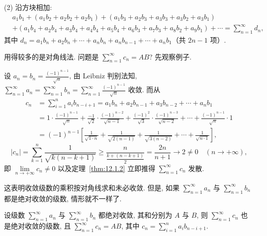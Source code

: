 (2) 沿方块相加:
\[
  \begin{aligned}
    &a_{1}b_{1}+(a_{1}b_{2}+a_{2}b_{2}+a_{2}b_{1})+(a_{1}b_{3}+a_{2}b_{3}+a_{3}b_{3}+a_{3}b_{2}+a_{3}b_{1})\\
    &+\left(a_{1}b_{4}+a_{2}b_{4}+a_{3}b_{4}+a_{4}b_{4}+a_{5}b_{4}+a_{6}b_{3}+a_{7}b_{3}+a_{8}b_{2}+a_{9}b_{1}\right)+\cdots=\sum_{n=1}^{\infty}d_{n},
  \end{aligned}
\]
其中 $d_{n}=a_{1}b_{n}+a_{2}b_{n}+\cdots+a_{n}b_{n}+a_{n}b_{n-1}+\cdots+a_{n}b_{1}$（共 $2n-1$ 项）.

用得较多的是对角线法. 问题是 $\sum_{n=1}^{\infty}c_{n}=AB$? 先观察例子.

\begin{example}\label{ex:12.4.1}
设 $a_{n}=b_{n}=\frac{(-1)^{n-1}}{\sqrt{n}}$, 由 Leibniz 判别法知, $\sum_{n=1}^{\infty}a_{n}=\sum_{n=1}^{\infty}b_{n}=\sum_{n=1}^{\infty}\frac{(-1)^{n-1}}{\sqrt{n}}$ 收敛. 而从
\[
  \begin{aligned}
    c_{n}&=\sum_{i=1}^{n}a_{i}b_{n-i+1}=a_{1}b_{n}+a_{2}b_{n-1}+a_{3}b_{n-2}+\cdots+a_{n}b_{1}\\
    &=1\cdot\frac{(-1)^{n-1}}{\sqrt{n}}+\frac{-1}{\sqrt{2}}\cdot\frac{(-1)^{n-2}}{\sqrt{n-1}}+\frac{(-1)^{2}}{\sqrt{3}}\cdot\frac{(-1)^{n-3}}{\sqrt{n-2}}+\cdots+\frac{(-1)^{n-1}}{\sqrt{n}}\cdot1\\
    &=(-1)^{n-1}\left[\frac{1}{\sqrt{1\cdot n}}+\frac{1}{\sqrt{2(n-1)}}+\frac{1}{\sqrt{3(n-2)}}+\cdots+\frac{1}{\sqrt{n\cdot1}}\right],
  \end{aligned}
\]
\[
  |c_{n}|=\sum_{k=1}^{n}\frac{1}{\sqrt{k(n-k+1)}}\geqslant\frac{n}{\frac{k+(n-k+1)}{2}}=\frac{2n}{n+1}\to2\neq0\quad(n\to+\infty),
\]
即 $\lim\limits_{n\to+\infty}c_{n}\neq0$ 以及定理~\ref{thm:12.1.2} 立即推得 $\sum_{n=1}^{\infty}c_{n}$ 发散.
\end{example}

这表明收敛级数的乘积按对角线求和未必收敛. 但是, 如果 $\sum_{n=1}^{\infty}a_{n}$ 与 $\sum_{n=1}^{\infty}b_{n}$ 都是绝对收敛的级数, 情形就不一样了.

\begin{theorem}[Cauchy]\label{thm:12.4.1}
设级数 $\sum_{n=1}^{\infty}a_{n}$ 与 $\sum_{n=1}^{\infty}b_{n}$ 都绝对收敛, 其和分别为 $A$ 与 $B$, 则 $\sum_{n=1}^{\infty}c_{n}$ 也是绝对收敛的级数, 且 $\sum_{n=1}^{\infty}c_{n}=AB$, 其中 $c_{n}=\sum_{i=1}^{n}a_{i}b_{n-i+1}$.
\end{theorem}

